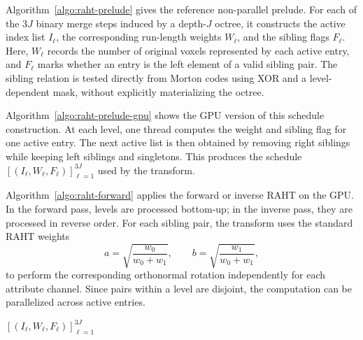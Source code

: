 Algorithm~\ref{algo:raht-prelude} gives the reference non-parallel prelude. For each of the $3J$ binary merge steps induced by a depth-$J$ octree, it constructs the active index list $I_\ell$, the corresponding run-length weights $W_\ell$, and the sibling flags $F_\ell$. Here, $W_\ell$ records the number of original voxels represented by each active entry, and $F_\ell$ marks whether an entry is the left element of a valid sibling pair. The sibling relation is tested directly from Morton codes using XOR and a level-dependent mask, without explicitly materializing the octree.

Algorithm~\ref{algo:raht-prelude-gpu} shows the GPU version of this schedule construction. At each level, one thread computes the weight and sibling flag for one active entry. The next active list is then obtained by removing right siblings while keeping left siblings and singletons. This produces the schedule $[(I_\ell, W_\ell, F_\ell)]_{\ell=1}^{3J}$ used by the transform.

Algorithm~\ref{algo:raht-forward} applies the forward or inverse RAHT on the GPU. In the forward pass, levels are processed bottom-up; in the inverse pass, they are processed in reverse order. For each sibling pair, the transform uses the standard RAHT weights
$$
a=\sqrt{\frac{w_0}{w_0+w_1}}, \qquad
b=\sqrt{\frac{w_1}{w_0+w_1}},
$$
to perform the corresponding orthonormal rotation independently for each attribute channel. Since pairs within a level are disjoint, the computation can be parallelized across active entries.


\begin{algorithm}[h!]
  \caption{RAHT prelude (non-parallel)}
  \label{algo:raht-prelude}
\SetAlgoLined
\DontPrintSemicolon
{}


\Return $[(I_\ell, W_\ell, F_\ell)]_{\ell=1}^{3J}$\;
\end{algorithm}

